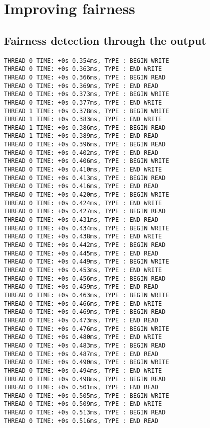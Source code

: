 \documentclass{article}
\begin{document}
\section{Improving fairness}	

	\subsection{Fairness detection through the output}
		
\begin{lstlisting}
THREAD 0 TIME: +0s 0.354ms, TYPE : BEGIN WRITE 
THREAD 0 TIME: +0s 0.363ms, TYPE : END WRITE 
THREAD 0 TIME: +0s 0.366ms, TYPE : BEGIN READ 
THREAD 0 TIME: +0s 0.369ms, TYPE : END READ 
THREAD 0 TIME: +0s 0.373ms, TYPE : BEGIN WRITE 
THREAD 0 TIME: +0s 0.377ms, TYPE : END WRITE 
THREAD 1 TIME: +0s 0.378ms, TYPE : BEGIN WRITE 
THREAD 1 TIME: +0s 0.383ms, TYPE : END WRITE 
THREAD 1 TIME: +0s 0.386ms, TYPE : BEGIN READ 
THREAD 1 TIME: +0s 0.389ms, TYPE : END READ 
THREAD 0 TIME: +0s 0.396ms, TYPE : BEGIN READ 
THREAD 0 TIME: +0s 0.402ms, TYPE : END READ 
THREAD 0 TIME: +0s 0.406ms, TYPE : BEGIN WRITE 
THREAD 0 TIME: +0s 0.410ms, TYPE : END WRITE 
THREAD 0 TIME: +0s 0.413ms, TYPE : BEGIN READ 
THREAD 0 TIME: +0s 0.416ms, TYPE : END READ 
THREAD 0 TIME: +0s 0.420ms, TYPE : BEGIN WRITE 
THREAD 0 TIME: +0s 0.424ms, TYPE : END WRITE 
THREAD 0 TIME: +0s 0.427ms, TYPE : BEGIN READ 
THREAD 0 TIME: +0s 0.431ms, TYPE : END READ 
THREAD 0 TIME: +0s 0.434ms, TYPE : BEGIN WRITE 
THREAD 0 TIME: +0s 0.438ms, TYPE : END WRITE 
THREAD 0 TIME: +0s 0.442ms, TYPE : BEGIN READ 
THREAD 0 TIME: +0s 0.445ms, TYPE : END READ 
THREAD 0 TIME: +0s 0.449ms, TYPE : BEGIN WRITE 
THREAD 0 TIME: +0s 0.453ms, TYPE : END WRITE 
THREAD 0 TIME: +0s 0.456ms, TYPE : BEGIN READ 
THREAD 0 TIME: +0s 0.459ms, TYPE : END READ 
THREAD 0 TIME: +0s 0.463ms, TYPE : BEGIN WRITE 
THREAD 0 TIME: +0s 0.466ms, TYPE : END WRITE 
THREAD 0 TIME: +0s 0.469ms, TYPE : BEGIN READ 
THREAD 0 TIME: +0s 0.473ms, TYPE : END READ 
THREAD 0 TIME: +0s 0.476ms, TYPE : BEGIN WRITE 
THREAD 0 TIME: +0s 0.480ms, TYPE : END WRITE 
THREAD 0 TIME: +0s 0.483ms, TYPE : BEGIN READ 
THREAD 0 TIME: +0s 0.487ms, TYPE : END READ 
THREAD 0 TIME: +0s 0.490ms, TYPE : BEGIN WRITE 
THREAD 0 TIME: +0s 0.494ms, TYPE : END WRITE 
THREAD 0 TIME: +0s 0.498ms, TYPE : BEGIN READ 
THREAD 0 TIME: +0s 0.501ms, TYPE : END READ 
THREAD 0 TIME: +0s 0.505ms, TYPE : BEGIN WRITE 
THREAD 0 TIME: +0s 0.509ms, TYPE : END WRITE 
THREAD 0 TIME: +0s 0.513ms, TYPE : BEGIN READ 
THREAD 0 TIME: +0s 0.516ms, TYPE : END READ
\end{lstlisting}
\end{document}
